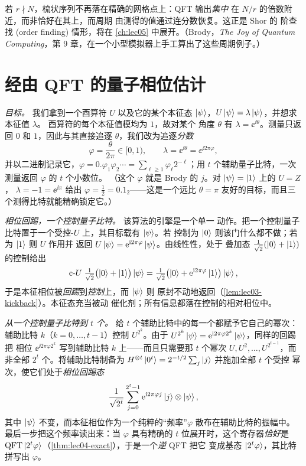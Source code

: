 \begin{remark}[当周期不整除 $N$ 时]
\label{rem:lec04-period}
若 $r\nmid N$，梳状序列不再落在精确的网格点上：QFT 输出\emph{集中}
在 $N/r$ 的倍数附近，而非恰好在其上，而周期
由测得的值通过连分数恢复。这正是 Shor 的
阶查找 (order finding) 情形，将在 \cref{ch:lec05} 中展开。（Brody，\emph{The Joy of Quantum
Computing}，第 9 章，在一个小型模拟器上手工算出了这些周期例子。）
\end{remark}

\section{经由 QFT 的量子相位估计}
\label{sec:lec04-3}

\emph{目标。} 我们拿到一个酉算符 $U$ 以及它的某个本征态
$\ket{\psi}$，$U\ket{\psi}=\lambda\ket{\psi}$，并想求本征值 $\lambda$。
酉算符的每个本征值模均为 $1$，故对某个
角度 $\theta$ 有 $\lambda=\ee^{\ii\theta}$。测量只返回 $0$ 和 $1$，因此与其直接追逐
$\theta$，我们改为追逐\emph{分数}
\begin{equation}
  \varphi=\frac{\theta}{2\pi}\in[0,1),\qquad
  \lambda=\ee^{\ii\theta}=\ee^{\ii 2\pi\varphi},
  \label{eq:lec04-phasefrac}
\end{equation}
并以二进制记录它，$\varphi=0.\varphi_1\varphi_2\cdots=\sum_{\ell\ge1}\varphi_\ell
2^{-\ell}$；用 $t$ 个辅助量子比特，一次测量返回 $\varphi$ 的 $t$ 个小数位。
（这个 $\varphi$ 就是 Brody 的 $j$。对 $\ket{\psi}=\ket1$ 上的 $U=Z$，
$\lambda=-1=\ee^{\ii\pi}$ 给出 $\varphi=\tfrac12=0.1_2$——这是一个远比
$\theta=\pi$ 友好的目标，而且三个测得比特就能精确锁定它。）

\emph{相位回踢，一个控制量子比特。} 该算法的引擎是一个单一
动作。把一个控制量子比特置于一个受控-$U$ 上，其目标载有 $\ket{\psi}$。若
控制为 $\ket0$ 则该门什么都不做；若为 $\ket1$ 则 $U$ 作用并
返回 $U\ket{\psi}=\mathrm{e}^{\mathrm{i} 2\pi\varphi}\ket{\psi}$。由线性性，处于
叠加态 $\tfrac1{\sqrt2}(\ket0+\ket1)$ 的控制给出
\[
  \text{c-}U\;\tfrac1{\sqrt2}\bigl(\ket0+\ket1\bigr)\ket{\psi}
   =\tfrac1{\sqrt2}\bigl(\ket0+\mathrm{e}^{\mathrm{i} 2\pi\varphi}\ket1\bigr)\ket{\psi},
\]
于是本征相位被\emph{回踢}到\emph{控制}上，而 $\ket{\psi}$ 则
原封不动地返回（\cref{lem:lec03-kickback}）。本征态充当被动
催化剂；所有信息都落在控制的相对相位中。

\emph{从一个控制量子比特到 $t$ 个。} 给 $t$ 个辅助比特中的每一个都赋予它自己的幂次：辅助比特
$k$（$k=0,\dots,t-1$）控制 $U^{2^{k}}$。由于
$U^{2^{k}}\ket{\psi}=\mathrm{e}^{\mathrm{i} 2\pi\varphi 2^{k}}\ket{\psi}$，同样的回踢把
相位 $\ee^{\ii 2\pi\varphi 2^{k}}$ 写到辅助比特 $k$ 上——而且只需要那 $t$ 个幂次
$U,U^{2},\dots,U^{2^{t-1}}$，而非全部 $2^{t}$ 个。将辅助比特制备为
$H^{\otimes t}\ket{0^{t}}=2^{-t/2}\sum_{j}\ket{j}$ 并施加全部 $t$ 个受控
幂次，使它们处于\emph{相位回踢态}
\[
  \frac{1}{\sqrt{2^{t}}}\sum_{j=0}^{2^{t}-1}\mathrm{e}^{\mathrm{i} 2\pi\varphi j}\ket{j}
  \otimes\ket{\psi},
\]
其中 $\ket{\psi}$ 不变，而本征相位作为一个纯粹的``频率''$\varphi$
散布在辅助比特的振幅中。最后一步把这个频率读出来：当 $\varphi$
具有精确的 $t$ 位展开时，这个寄存器\emph{恰好}是
$\mathrm{QFT}\ket{2^{t}\varphi}$（\cref{thm:lec04-exact}），于是一个\emph{逆} QFT 把它
变成基态 $\ket{2^{t}\varphi}$，其比特拼写出 $\varphi$。

